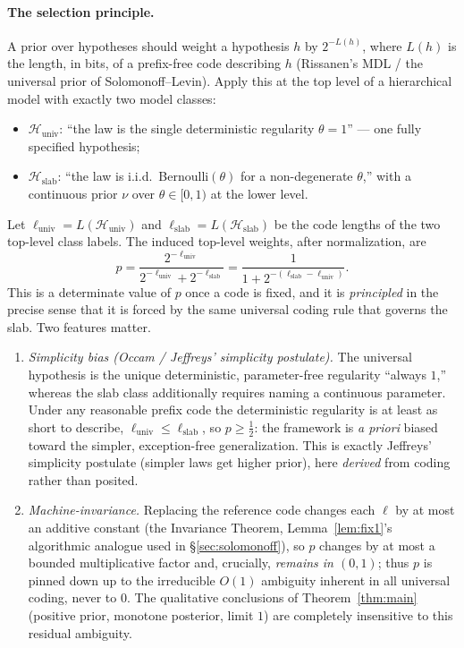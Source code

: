 \documentclass{amsart}
\theoremstyle{definition}
\begin{document}
\paragraph{The selection principle.}
A prior over hypotheses should weight a hypothesis $h$ by $2^{-L(h)}$, where
$L(h)$ is the length, in bits, of a prefix-free code describing $h$ (Rissanen's
MDL / the universal prior of Solomonoff--Levin). Apply this at the top level of a
hierarchical model with exactly two model classes:
\begin{itemize}
\item $\mathcal H_{\mathrm{univ}}$: ``the law is the single deterministic
regularity $\theta=1$'' --- one fully specified hypothesis;
\item $\mathcal H_{\mathrm{slab}}$: ``the law is i.i.d.\ Bernoulli$(\theta)$ for a
non-degenerate $\theta$,'' with a continuous prior $\nu$ over $\theta\in[0,1)$ at
the lower level.
\end{itemize}
Let $\ell_{\mathrm{univ}}=L(\mathcal H_{\mathrm{univ}})$ and
$\ell_{\mathrm{slab}}=L(\mathcal H_{\mathrm{slab}})$ be the code lengths of the
two top-level class labels. The induced top-level weights, after normalization,
are
\begin{equation}\label{eq:pMDL}
  p=\frac{2^{-\ell_{\mathrm{univ}}}}{2^{-\ell_{\mathrm{univ}}}+2^{-\ell_{\mathrm{slab}}}}
   =\frac{1}{1+2^{-(\ell_{\mathrm{slab}}-\ell_{\mathrm{univ}})}} .
\end{equation}
This is a determinate value of $p$ once a code is fixed, and it is
\emph{principled} in the precise sense that it is forced by the same universal
coding rule that governs the slab. Two features matter.
\begin{enumerate}
\item[(a)] \emph{Simplicity bias (Occam / Jeffreys' simplicity postulate).} The
universal hypothesis is the unique deterministic, parameter-free regularity
``always $1$,'' whereas the slab class additionally requires naming a continuous
parameter. Under any reasonable prefix code the deterministic regularity is at
least as short to describe, $\ell_{\mathrm{univ}}\le\ell_{\mathrm{slab}}$, so
$p\ge\tfrac12$: the framework is \emph{a priori} biased toward the simpler,
exception-free generalization. This is exactly Jeffreys' simplicity postulate
(simpler laws get higher prior), here \emph{derived} from coding rather than
posited.
\item[(b)] \emph{Machine-invariance.} Replacing the reference code changes each
$\ell$ by at most an additive constant (the Invariance Theorem,
Lemma~\ref{lem:fix1}'s algorithmic analogue used in \S\ref{sec:solomonoff}), so
$p$ changes by at most a bounded multiplicative factor and, crucially,
\emph{remains in $(0,1)$}; thus $p$ is pinned down up to the irreducible $O(1)$
ambiguity inherent in all universal coding, never to $0$. The qualitative
conclusions of Theorem~\ref{thm:main} (positive prior, monotone posterior,
limit $1$) are completely insensitive to this residual ambiguity.
\end{enumerate}
\end{document}
